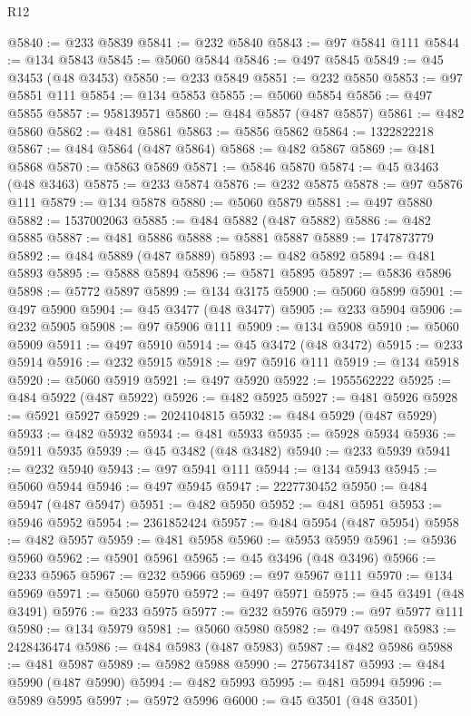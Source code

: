 \begin{lexlean}{R12}
\begin{coremodule}
{{{{{{{{{{{{{{{{{{{{{{{{{{{{{{{{{{{{{{{{{{{{{{{{{{{{{{{{{{{{{{{{{{{{{{{{{{{{{{{{{{@5840 := @233 @5839
@5841 := @232 @5840
@5843 := @97 @5841 @111
@5844 := @134 @5843
@5845 := @5060 @5844
@5846 := @497 @5845
@5849 := @45 @3453 (@48 @3453)
@5850 := @233 @5849
@5851 := @232 @5850
@5853 := @97 @5851 @111
@5854 := @134 @5853
@5855 := @5060 @5854
@5856 := @497 @5855
@5857 := 958139571
@5860 := @484 @5857 (@487 @5857)
@5861 := @482 @5860
@5862 := @481 @5861
@5863 := @5856 @5862
@5864 := 1322822218
@5867 := @484 @5864 (@487 @5864)
@5868 := @482 @5867
@5869 := @481 @5868
@5870 := @5863 @5869
@5871 := @5846 @5870
@5874 := @45 @3463 (@48 @3463)
@5875 := @233 @5874
@5876 := @232 @5875
@5878 := @97 @5876 @111
@5879 := @134 @5878
@5880 := @5060 @5879
@5881 := @497 @5880
@5882 := 1537002063
@5885 := @484 @5882 (@487 @5882)
@5886 := @482 @5885
@5887 := @481 @5886
@5888 := @5881 @5887
@5889 := 1747873779
@5892 := @484 @5889 (@487 @5889)
@5893 := @482 @5892
@5894 := @481 @5893
@5895 := @5888 @5894
@5896 := @5871 @5895
@5897 := @5836 @5896
@5898 := @5772 @5897
@5899 := @134 @3175
@5900 := @5060 @5899
@5901 := @497 @5900
@5904 := @45 @3477 (@48 @3477)
@5905 := @233 @5904
@5906 := @232 @5905
@5908 := @97 @5906 @111
@5909 := @134 @5908
@5910 := @5060 @5909
@5911 := @497 @5910
@5914 := @45 @3472 (@48 @3472)
@5915 := @233 @5914
@5916 := @232 @5915
@5918 := @97 @5916 @111
@5919 := @134 @5918
@5920 := @5060 @5919
@5921 := @497 @5920
@5922 := 1955562222
@5925 := @484 @5922 (@487 @5922)
@5926 := @482 @5925
@5927 := @481 @5926
@5928 := @5921 @5927
@5929 := 2024104815
@5932 := @484 @5929 (@487 @5929)
@5933 := @482 @5932
@5934 := @481 @5933
@5935 := @5928 @5934
@5936 := @5911 @5935
@5939 := @45 @3482 (@48 @3482)
@5940 := @233 @5939
@5941 := @232 @5940
@5943 := @97 @5941 @111
@5944 := @134 @5943
@5945 := @5060 @5944
@5946 := @497 @5945
@5947 := 2227730452
@5950 := @484 @5947 (@487 @5947)
@5951 := @482 @5950
@5952 := @481 @5951
@5953 := @5946 @5952
@5954 := 2361852424
@5957 := @484 @5954 (@487 @5954)
@5958 := @482 @5957
@5959 := @481 @5958
@5960 := @5953 @5959
@5961 := @5936 @5960
@5962 := @5901 @5961
@5965 := @45 @3496 (@48 @3496)
@5966 := @233 @5965
@5967 := @232 @5966
@5969 := @97 @5967 @111
@5970 := @134 @5969
@5971 := @5060 @5970
@5972 := @497 @5971
@5975 := @45 @3491 (@48 @3491)
@5976 := @233 @5975
@5977 := @232 @5976
@5979 := @97 @5977 @111
@5980 := @134 @5979
@5981 := @5060 @5980
@5982 := @497 @5981
@5983 := 2428436474
@5986 := @484 @5983 (@487 @5983)
@5987 := @482 @5986
@5988 := @481 @5987
@5989 := @5982 @5988
@5990 := 2756734187
@5993 := @484 @5990 (@487 @5990)
@5994 := @482 @5993
@5995 := @481 @5994
@5996 := @5989 @5995
@5997 := @5972 @5996
@6000 := @45 @3501 (@48 @3501)
}}}}}}}}}}}}}}}}}}}}}}}}}}}}}}}}}}}}}}}}}}}}}}}}}}}}}}}}}}}}}}}}}}}}}}}}}}}}}}}}}}
\end{coremodule}
\end{lexlean}

